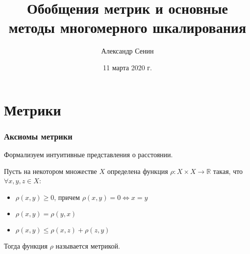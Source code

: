 \documentclass[10pt]{beamer}
\title[Short title]{Обобщения метрик и основные методы многомерного шкалирования} %
\author{Александр Сенин} %
\date{11 марта 2020 г.} %
\begin{document}
\begin{frame}
\titlepage %
\end{frame}



\section{Метрики} %



\begin{frame}
\frametitle{Аксиомы метрики}
Формализуем интуитивные представления о расстоянии.
\vspace{\baselineskip}

Пусть на некотором множестве $X$ определена функция $\rho: X \times X \to \mathbb{R}$ такая, что $\forall x, y, z \in X$:
\begin{itemize}
	\item $\rho(x, y) \geqslant 0$, причем $\rho(x, y) = 0 \Leftrightarrow x = y$
	\item $\rho(x, y) = \rho(y, x)$
	\item $\rho(x, y) \leqslant \rho(x, z) + \rho(z, y)$
\end{itemize}

\vspace{\baselineskip}
Тогда функция $\rho$ называется метрикой.
\end{frame}
\end{document}
